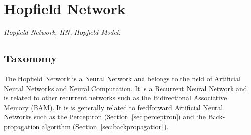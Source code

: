 

\section{Hopfield Network} 
\label{sec:hopfield}

\emph{Hopfield Network, HN, Hopfield Model.}

\subsection{Taxonomy}
The Hopfield Network is a Neural Network and belongs to the field of Artificial Neural Networks and Neural Computation.
It is a Recurrent Neural Network and is related to other recurrent networks such as the Bidirectional Associative Memory (BAM).
It is is generally related to feedforward Artificial Neural Networks such as the Perceptron (Section~\ref{sec:perceptron}) and the Back-propagation algorithm (Section~\ref{sec:backpropagation}).

